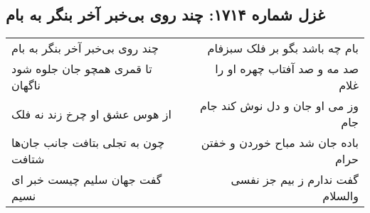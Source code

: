 \begin{center}
\section*{غزل شماره ۱۷۱۴: چند روی بی‌خبر آخر بنگر به بام}
\label{sec:1714}
\begin{longtable}{l p{0.5cm} r}
چند روی بی‌خبر آخر بنگر به بام
&&
بام چه باشد بگو بر فلک سبزفام
\\
تا قمری همچو جان جلوه شود ناگهان
&&
صد مه و صد آفتاب چهره او را غلام
\\
از هوس عشق او چرخ زند نه فلک
&&
وز می او جان و دل نوش کند جام جام
\\
چون به تجلی بتافت جانب جان‌ها شتافت
&&
باده جان شد مباح خوردن و خفتن حرام
\\
گفت جهان سلیم چیست خبر ای نسیم
&&
گفت ندارم ز بیم جز نفسی والسلام
\\
\end{longtable}
\end{center}
